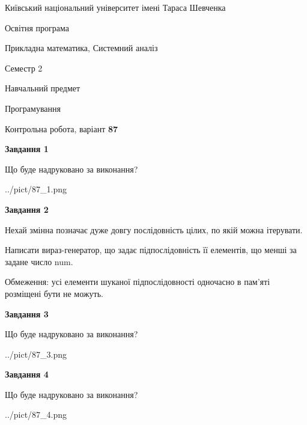 \documentclass[12pt, ukrainian]{article}
\begin{document}
{{\begin {small}\par
{ \center  Київський національний університет імені Тараса Шевченка \par}
{\parbox {5 cm}{Освітня програма \hfill}{\parbox {8 cm}{Прикладна математика, Системний аналіз \hfill}}\parbox {5 cm}{\hfill Семестр 2}}\par
{\parbox {5 cm} {Навчальний предмет \hfill}\parbox {7 cm}{Програмування \hfill}\parbox {6cm}{\hfill}\par}\vspace{-7pt} \end{small}}{\center Контрольна робота, варіант  \No \textbf
{ 87 }\par}}
{
\begin {large}
{\begin {center}\textbf{Завдання 1}\end {center}}\par
Що буде надруковано за виконання?\par\par
\begin{center}
	{../pict/87_1.png}
\end{center}
\newpage

{\begin {center}\textbf{Завдання 2}\end {center}}\par
Нехай змінна  позначає дуже довгу послідовність цілих, по якій можна ітерувати.

Написати вираз-генератор, що задає підпослідовність її елементів, що менші за задане число num.

Обмеження: усі елементи шуканої підпослідовності одночасно в пам'яті розміщені бути не можуть.\par
\newpage

{\begin {center}\textbf{Завдання 3}\end {center}}\par
Що буде надруковано за виконання?\par
\begin{center}
	{../pict/87_3.png}
\end{center}
\newpage

{\begin {center}\textbf{Завдання 4}\end {center}}\par
Що буде надруковано за виконання?\par
\begin{center}
	{../pict/87_4.png}
\end{center}
\newpage


\end{large}}
\end{document}
